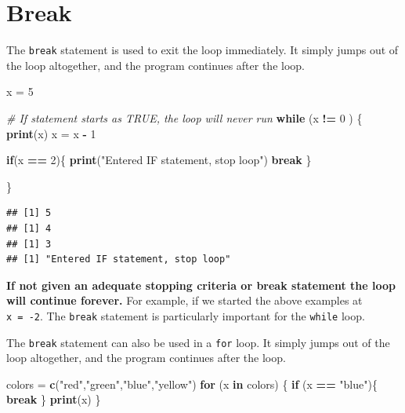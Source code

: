 \documentclass[
]{book}
\newenvironment{Shaded}{\begin{snugshade}}{\end{snugshade}}
\newcommand{\CommentTok}[1]{\textcolor[rgb]{0.56,0.35,0.01}{\textit{#1}}}
\newcommand{\ControlFlowTok}[1]{\textcolor[rgb]{0.13,0.29,0.53}{\textbf{#1}}}
\newcommand{\DecValTok}[1]{\textcolor[rgb]{0.00,0.00,0.81}{#1}}
\newcommand{\KeywordTok}[1]{\textcolor[rgb]{0.13,0.29,0.53}{\textbf{#1}}}
\newcommand{\NormalTok}[1]{#1}
\newcommand{\OperatorTok}[1]{\textcolor[rgb]{0.81,0.36,0.00}{\textbf{#1}}}
\newcommand{\StringTok}[1]{\textcolor[rgb]{0.31,0.60,0.02}{#1}}
\begin{document}
\hypertarget{break}{%
\section{Break}\label{break}}

The \texttt{break} statement is used to exit the loop immediately. It simply jumps out of the loop altogether, and the program continues after the loop.

\begin{Shaded}
\begin{Highlighting}[]
\NormalTok{x =}\StringTok{ }\DecValTok{5}

\CommentTok{# If statement starts as TRUE,  the loop will never run }
\ControlFlowTok{while}\NormalTok{ (x }\OperatorTok{!=}\StringTok{ }\DecValTok{0}\NormalTok{ ) \{}
  \KeywordTok{print}\NormalTok{(x)}
\NormalTok{  x =}\StringTok{ }\NormalTok{x }\OperatorTok{-}\StringTok{ }\DecValTok{1}
  
  \ControlFlowTok{if}\NormalTok{(x }\OperatorTok{==}\StringTok{ }\DecValTok{2}\NormalTok{)\{}
    \KeywordTok{print}\NormalTok{(}\StringTok{"Entered IF statement, stop loop"}\NormalTok{)}
    \ControlFlowTok{break} 
\NormalTok{  \}}
  
\NormalTok{\}}
\end{Highlighting}
\end{Shaded}

\begin{verbatim}
## [1] 5
## [1] 4
## [1] 3
## [1] "Entered IF statement, stop loop"
\end{verbatim}

\textbf{If not given an adequate stopping criteria or break statement the loop will continue forever.} For example, if we started the above examples at \texttt{x\ =\ -2}. The \texttt{break} statement is particularly important for the \texttt{while} loop.

The \texttt{break} statement can also be used in a \texttt{for} loop. It simply jumps out of the loop altogether, and the program continues after the loop.

\begin{Shaded}
\begin{Highlighting}[]
\NormalTok{colors =}\StringTok{ }\KeywordTok{c}\NormalTok{(}\StringTok{"red"}\NormalTok{,}\StringTok{"green"}\NormalTok{,}\StringTok{"blue"}\NormalTok{,}\StringTok{"yellow"}\NormalTok{)}
\ControlFlowTok{for}\NormalTok{ (x }\ControlFlowTok{in}\NormalTok{ colors) \{}
  \ControlFlowTok{if}\NormalTok{ (x }\OperatorTok{==}\StringTok{ "blue"}\NormalTok{)\{}
       \ControlFlowTok{break} 
\NormalTok{  \}}
  \KeywordTok{print}\NormalTok{(x)}
\NormalTok{\}}
\end{Highlighting}
\end{Shaded}
\end{document}
